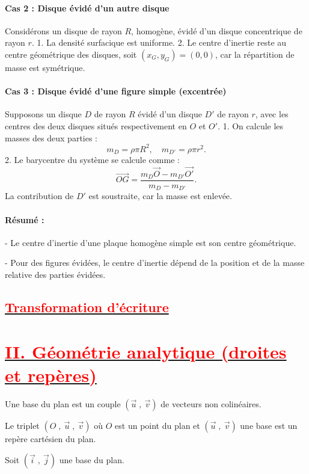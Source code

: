\documentclass{article}
\begin{document}
\paragraph{Cas 2 : Disque évidé d’un autre disque}  
Considérons un disque de rayon \( R \), homogène, évidé d’un disque concentrique de rayon \( r \).  
1. La densité surfacique est uniforme.  
2. Le centre d’inertie reste au centre géométrique des disques, soit \( (x_G, y_G) = (0, 0) \), car la répartition de masse est symétrique.

\paragraph{Cas 3 : Disque évidé d’une figure simple (excentrée)}  
Supposons un disque \( D \) de rayon \( R \) évidé d’un disque \( D' \) de rayon \( r \), avec les centres des deux disques situés respectivement en \( O \) et \( O' \).  
1. On calcule les masses des deux parties :  
   \[
   m_D = \rho \pi R^2, \quad m_{D'} = \rho \pi r^2.
   \]
2. Le barycentre du système se calcule comme :  
   \[
   \overrightarrow{OG} = \frac{m_D \overrightarrow{O} - m_{D'} \overrightarrow{O'}}{m_D - m_{D'}}.
   \]
   La contribution de \( D' \) est soustraite, car la masse est enlevée.

\paragraph{Résumé :}  
- Le centre d’inertie d’une plaque homogène simple est son centre géométrique. 
 
- Pour des figures évidées, le centre d’inertie dépend de la position et de la masse relative des parties évidées.

\subsection*{\underline{\textbf{\textcolor{red}{Transformation d'écriture}}}}
\section*{\underline{\textbf{\textcolor{red}{II. Géométrie analytique (droites et repères)}}}}
		Une base du plan est un couple $(\vec{u}\;,\ \vec{v})$ de vecteurs non colinéaires.
		
		Le triplet $(O\;,\ \vec{u}\;,\ \vec{v})$ où $O$ est un point du plan et $(\vec{u}\;,\ \vec{v})$ une base est un repère cartésien du plan.
		
		Soit $(\vec{i}\;,\ \vec{j})$ une base du plan.
		
\end{document}
